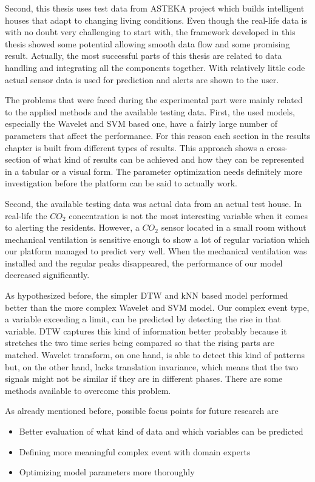 Second, this thesis uses test data from ASTEKA project which builds intelligent houses that adapt to changing living conditions. Even though the real-life data is with no doubt very challenging to start with, the framework developed in this thesis showed some potential allowing smooth data flow and some promising result. Actually, the most successful parts of this thesis are related to data handling and integrating all the components together. With relatively little code actual sensor data is used for prediction and alerts are shown to the user.

The problems that were faced during the experimental part were mainly related to the applied methods and the available testing data. First, the used models, especially the Wavelet and SVM based one, have a fairly large number of parameters that affect the performance. For this reason each section in the results chapter is built from different types of results. This approach shows a cross-section of what kind of results can be achieved and how they can be represented in a tabular or a visual form. The parameter optimization needs definitely more investigation before the platform can be said to actually work.

Second, the available testing data was actual data from an actual test house. In real-life the $CO_2$ concentration is not the most interesting variable when it comes to alerting the residents. However, a $CO_2$ sensor located in a small room without mechanical ventilation is sensitive enough to show a lot of regular variation which our platform managed to predict very well. When the mechanical ventilation was installed and the regular peaks disappeared, the performance of our model decreased significantly.

As hypothesized before, the simpler DTW and kNN based model performed better than the more complex Wavelet and SVM model. Our complex event type, a variable exceeding a limit, can be predicted by detecting the rise in that variable. DTW captures this kind of information better probably because it stretches the two time series being compared so that the rising parts are matched. Wavelet transform, on one hand, is able to detect this kind of patterns but, on the other hand, lacks translation invariance, which means that the two signals might not be similar if they are in different phases. There are some methods available to overcome this problem. \cite{struzik99}

As already mentioned before, possible focus points for future research are
\begin{itemize}
\item{Better evaluation of what kind of data and which variables can be predicted}
\item{Defining more meaningful complex event with domain experts}
\item{Optimizing model parameters more thoroughly}
\end{itemize}

